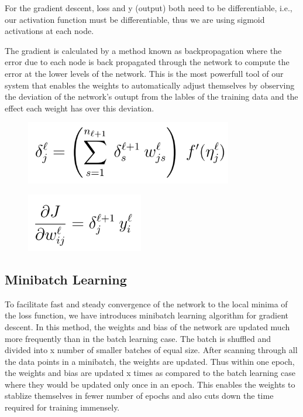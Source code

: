 \documentclass[conference]{IEEEtran}
\begin{document}
For the gradient descent, loss and y (output) both need to be differentiable, i.e., our activation function must be differentiable, thus we are using sigmoid activations at each node.

The gradient is calculated by a method known as backpropagation where the error due to each node is back propagated through the network to compute the error at the lower levels of the network. This is the most powerfull tool of our system that enables the weights to automatically adjust themselves by observing the deviation of the network's outupt from the lables of the training data and the effect each weight has over this deviation.

\begin{figure}[h]
	\centering
	\includegraphics[width=0.55\linewidth]{delta}
\end{figure}
\begin{figure}[h]
	\centering
	\includegraphics[width=0.3\linewidth]{grad}
\end{figure}

\subsection{Minibatch Learning}
To facilitate fast and steady convergence of the network to the local minima of the loss function, we have introduces minibatch learning algorithm for gradient descent. In this method, the weights and bias of the network are updated much more frequently than in the batch learning case. The batch is shuffled and divided into x number of smaller batches of equal size. After scanning through all the data points in a minibatch, the weights are updated. Thus within one epoch, the weights and bias are updated x times as compared to the batch learning case where they would be updated only once in an epoch. This enables the weights to stablize themselves in fewer number of epochs and also cuts down the time required for training immensely.
\end{document}
